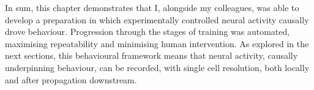 In sum, this chapter demonstrates that I, alongside my colleagues, was able to develop a preparation in which experimentally controlled neural activity causally drove behaviour. Progression through the stages of training was automated, maximising repeatability and minimising human intervention. As explored in the next sections, this behavioural framework means that neural activity, causally underpinning behaviour, can be recorded, with single cell resolution, both locally and after propagation downstream.